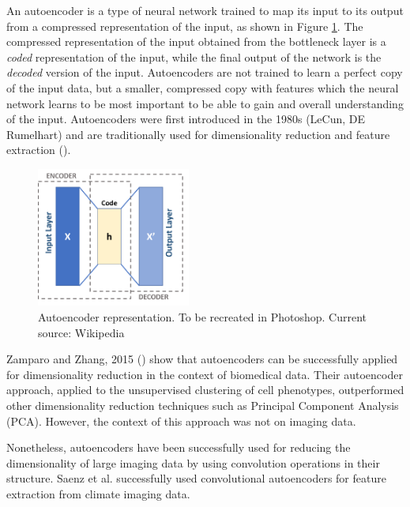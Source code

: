 \documentclass{l4proj}
\begin{document}
An autoencoder is a type of neural network trained to map its input to its output from a compressed representation of the input, as shown in Figure \ref{fig:autoencoder}. The compressed representation of the input obtained from the bottleneck layer is a \textit{coded} representation of the input, while the final output of the network is the \textit{decoded} version of the input. Autoencoders are not trained to learn a perfect copy of the input data, but a smaller, compressed copy with features which the neural network learns to be most important to be able to gain and overall understanding of the input. Autoencoders were first introduced in the 1980s (LeCun, DE Rumelhart) and are traditionally used for dimensionality reduction and feature extraction (\cite{http://www.deeplearningbook.org/contents/autoencoders.html}).

\begin{figure}[h!]
    \centering
    \includegraphics[width=0.45\textwidth]{dissertation/figures/autoencoder_schema.png}
    \caption{Autoencoder representation. To be recreated in Photoshop. Current source: Wikipedia}
    \label{fig:autoencoder}
\end{figure}

Zamparo and Zhang, 2015 (\cite{https://arxiv.org/pdf/1501.01348.pdf}) show that autoencoders can be successfully applied for dimensionality reduction in the context of biomedical data. Their autoencoder approach, applied to the unsupervised clustering of cell phenotypes, outperformed other dimensionality reduction techniques such as Principal Component Analysis (PCA). However, the context of this approach was not on imaging data.

Nonetheless, autoencoders have been successfully used for reducing the dimensionality of large imaging data by using convolution operations in their structure. Saenz et al. successfully used convolutional autoencoders for feature extraction from climate imaging data. %
\end{document}
